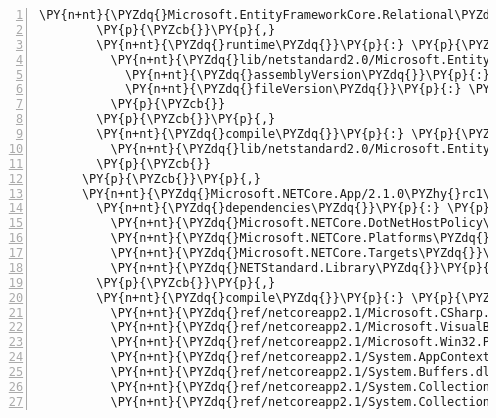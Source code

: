 \begin{Verbatim}[commandchars=\\\{\},numbers=left,firstnumber=1,stepnumber=1,numberblanklines=0]
          \PY{n+nt}{\PYZdq{}Microsoft.EntityFrameworkCore.Relational\PYZdq{}}\PY{p}{:} \PY{l+s+s2}{\PYZdq{}2.1.0\PYZhy{}rc1\PYZhy{}final\PYZdq{}}
        \PY{p}{\PYZcb{}}\PY{p}{,}
        \PY{n+nt}{\PYZdq{}runtime\PYZdq{}}\PY{p}{:} \PY{p}{\PYZob{}}
          \PY{n+nt}{\PYZdq{}lib/netstandard2.0/Microsoft.EntityFrameworkCore.Sqlite.dll\PYZdq{}}\PY{p}{:} \PY{p}{\PYZob{}}
            \PY{n+nt}{\PYZdq{}assemblyVersion\PYZdq{}}\PY{p}{:} \PY{l+s+s2}{\PYZdq{}2.1.0.0\PYZdq{}}\PY{p}{,}
            \PY{n+nt}{\PYZdq{}fileVersion\PYZdq{}}\PY{p}{:} \PY{l+s+s2}{\PYZdq{}2.1.0.18116\PYZdq{}}
          \PY{p}{\PYZcb{}}
        \PY{p}{\PYZcb{}}\PY{p}{,}
        \PY{n+nt}{\PYZdq{}compile\PYZdq{}}\PY{p}{:} \PY{p}{\PYZob{}}
          \PY{n+nt}{\PYZdq{}lib/netstandard2.0/Microsoft.EntityFrameworkCore.Sqlite.dll\PYZdq{}}\PY{p}{:} \PY{p}{\PYZob{}}\PY{p}{\PYZcb{}}
        \PY{p}{\PYZcb{}}
      \PY{p}{\PYZcb{}}\PY{p}{,}
      \PY{n+nt}{\PYZdq{}Microsoft.NETCore.App/2.1.0\PYZhy{}rc1\PYZdq{}}\PY{p}{:} \PY{p}{\PYZob{}}
        \PY{n+nt}{\PYZdq{}dependencies\PYZdq{}}\PY{p}{:} \PY{p}{\PYZob{}}
          \PY{n+nt}{\PYZdq{}Microsoft.NETCore.DotNetHostPolicy\PYZdq{}}\PY{p}{:} \PY{l+s+s2}{\PYZdq{}2.1.0\PYZhy{}rc1\PYZdq{}}\PY{p}{,}
          \PY{n+nt}{\PYZdq{}Microsoft.NETCore.Platforms\PYZdq{}}\PY{p}{:} \PY{l+s+s2}{\PYZdq{}2.1.0\PYZhy{}rc1\PYZdq{}}\PY{p}{,}
          \PY{n+nt}{\PYZdq{}Microsoft.NETCore.Targets\PYZdq{}}\PY{p}{:} \PY{l+s+s2}{\PYZdq{}2.1.0\PYZhy{}rc1\PYZdq{}}\PY{p}{,}
          \PY{n+nt}{\PYZdq{}NETStandard.Library\PYZdq{}}\PY{p}{:} \PY{l+s+s2}{\PYZdq{}2.0.3\PYZdq{}}
        \PY{p}{\PYZcb{}}\PY{p}{,}
        \PY{n+nt}{\PYZdq{}compile\PYZdq{}}\PY{p}{:} \PY{p}{\PYZob{}}
          \PY{n+nt}{\PYZdq{}ref/netcoreapp2.1/Microsoft.CSharp.dll\PYZdq{}}\PY{p}{:} \PY{p}{\PYZob{}}\PY{p}{\PYZcb{}}\PY{p}{,}
          \PY{n+nt}{\PYZdq{}ref/netcoreapp2.1/Microsoft.VisualBasic.dll\PYZdq{}}\PY{p}{:} \PY{p}{\PYZob{}}\PY{p}{\PYZcb{}}\PY{p}{,}
          \PY{n+nt}{\PYZdq{}ref/netcoreapp2.1/Microsoft.Win32.Primitives.dll\PYZdq{}}\PY{p}{:} \PY{p}{\PYZob{}}\PY{p}{\PYZcb{}}\PY{p}{,}
          \PY{n+nt}{\PYZdq{}ref/netcoreapp2.1/System.AppContext.dll\PYZdq{}}\PY{p}{:} \PY{p}{\PYZob{}}\PY{p}{\PYZcb{}}\PY{p}{,}
          \PY{n+nt}{\PYZdq{}ref/netcoreapp2.1/System.Buffers.dll\PYZdq{}}\PY{p}{:} \PY{p}{\PYZob{}}\PY{p}{\PYZcb{}}\PY{p}{,}
          \PY{n+nt}{\PYZdq{}ref/netcoreapp2.1/System.Collections.Concurrent.dll\PYZdq{}}\PY{p}{:} \PY{p}{\PYZob{}}\PY{p}{\PYZcb{}}\PY{p}{,}
          \PY{n+nt}{\PYZdq{}ref/netcoreapp2.1/System.Collections.Immutable.dll\PYZdq{}}\PY{p}{:} \PY{p}{\PYZob{}}\PY{p}{\PYZcb{}}\PY{p}{,}

\end{Verbatim}
